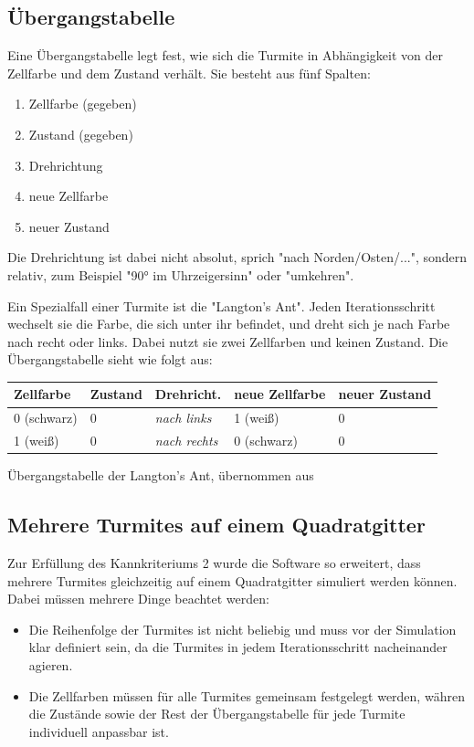 \subsection{Übergangstabelle}
Eine Übergangstabelle legt fest, wie sich die Turmite in Abhängigkeit von der Zellfarbe und dem Zustand verhält. Sie besteht aus fünf Spalten:
\begin{enumerate}
    \item Zellfarbe (gegeben)
    \item Zustand (gegeben)
    \item Drehrichtung
    \item neue Zellfarbe
    \item neuer Zustand
\end{enumerate}

Die Drehrichtung ist dabei nicht absolut, sprich "nach Norden/Osten/...", sondern relativ, zum Beispiel "90° im Uhrzeigersinn" oder "umkehren".

Ein Spezialfall einer Turmite ist die "Langton's Ant". Jeden Iterationsschritt wechselt sie die Farbe, die sich unter ihr befindet, und dreht sich je nach Farbe nach recht oder links. Dabei nutzt sie zwei Zellfarben und keinen Zustand. Die Übergangstabelle sieht wie folgt aus:

\begin{tabular}{|l|l||l|l|l|}
    \textbf{Zellfarbe} & \textbf{Zustand} & \textbf{Drehricht.} & \textbf{neue Zellfarbe} & \textbf{neuer Zustand} \\
    \hline
    0 (schwarz) & 0 & \textit{nach links} & 1 (weiß) & 0 \\
    1 (weiß) & 0 & \textit{nach rechts} & 0 (schwarz) & 0 \\
\end{tabular}
Übergangstabelle der Langton's Ant, übernommen aus \cite{pflichtenheft}

\subsection{Mehrere Turmites auf einem Quadratgitter}
Zur Erfüllung des Kannkriteriums 2 \cite{pflichtenheft} wurde die Software so erweitert, dass mehrere Turmites gleichzeitig auf einem Quadratgitter simuliert werden können. Dabei müssen mehrere Dinge beachtet werden:

\begin{itemize}
    \item Die Reihenfolge der Turmites ist nicht beliebig und muss vor der Simulation klar definiert sein, da die Turmites in jedem Iterationsschritt nacheinander agieren.
    \item Die Zellfarben müssen für alle Turmites gemeinsam festgelegt werden, währen die Zustände sowie der Rest der Übergangstabelle für jede Turmite individuell anpassbar ist.
\end{itemize}

